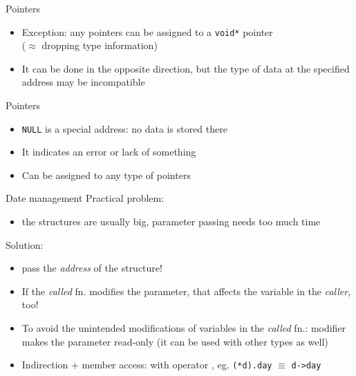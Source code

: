 \documentclass[usenames,dvipsnames,aspectratio=169]{beamer}
\begin{document}
\begin{frame}{Pointers}
  \begin{itemize}
    \small
    \item Exception: any pointers can be assigned to a \texttt{void*} pointer \\($\approx$ dropping type information)
  \end{itemize}
  \begin{exampleblock}{}
    \small
    
  \end{exampleblock}
  \begin{itemize}
    \small
    \item It can be done in the opposite direction, but the type of data at the specified address may be incompatible
  \end{itemize}
  \begin{alertblock}{}
    \footnotesize
    
  \end{alertblock}
\end{frame}

\begin{frame}{Pointers}
  \begin{itemize}
    \item \texttt{NULL} is a special address: no data is stored there
    \item It indicates an error or lack of something
    \item Can be assigned to any type of pointers
  \end{itemize}
  \begin{exampleblock}{}
    \footnotesize
    
  \end{exampleblock}
\end{frame}

\begin{frame}{Date management}
  Practical problem:
  \begin{itemize}
    \item[] the structures are usually big, parameter passing needs too much time
  \end{itemize}
  Solution:
  \begin{itemize}
    \item pass the \emph{address} of the structure!
    \item {} If the \emph{called} fn. modifies the parameter, that affects the variable in the \emph{caller}, too!
    \item To avoid the unintended modifications of variables in the \emph{called} fn.: modifier  makes the parameter read-only (it can be used with other types as well)
    \item Indirection + member access: with operator \kiemel{\texttt{->}}, eg. \texttt{(*d).day} $\equiv$ \texttt{d->day}
  \end{itemize}
\end{frame}
\end{document}
